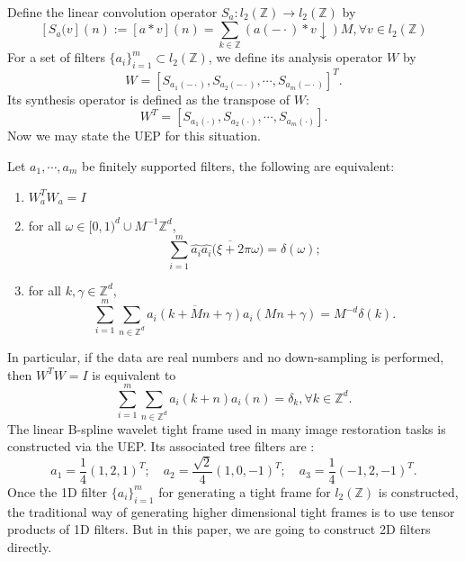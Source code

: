 \documentclass[a4paper]{article}
\begin{document}
Define the linear convolution operator $S_a: l_2(\mathbb{Z}) \rightarrow l_2(\mathbb{Z})$ by 
\[
[S_a(v](n):=[a*v](n)=\sum_{k\in\mathbb{Z}} (a(-\cdot)*v \downarrow)M, \forall v\in l_2(\mathbb{Z})
\]
For a set of filters $\{a_i\}_{i=1}^m\subset l_2(\mathbb{Z})$, we define its analysis operator $W$ by 
\[
	W=[S_{a_1(-\cdot)},S_{a_2(-\cdot)},\cdots,S_{a_m(-\cdot)}]^T.
\]
Its synthesis operator is defined as the transpose of $W$:
\[
	W^T=[S_{a_1(\cdot)},S_{a_2(\cdot)},\cdots, S_{a_m(\cdot )}].
\]
Now we may state the UEP for this situation.
\begin{prop}[cite]
Let $a_1,\cdots,a_m$ be finitely supported filters, the following are equivalent:
\begin{enumerate}
\item $W_a^T W_a = I$
\item for all $\omega \in [0,1)^d\cup M^{-1}\mathbb{Z}^d$,
	\[
		\sum_{i=1}^m \hat{a_i}\overline{\hat{a_i}(\xi + 2\pi\omega})=\delta(\omega);
	\]
\item for  all $k,\gamma \in \mathbb{Z}^d$,
	\[
		\sum_{i=1}^m \sum_{n\in\mathbb{Z}^d} \overline{a_i(k+Mn+\gamma)}a_i(Mn+\gamma)=M^{-d}\delta(k).
	\]
\end{enumerate}
\end{prop}
In particular, if the data are real numbers and no down-sampling is performed, then $W^TW=I$ is equivalent to 
\begin{equation}
\label{eq:uep}
	\sum_{i=1}^m \sum_{n\in \mathbb{Z}^d} a_i(k+n) a_i(n)=\delta_k, \forall k\in \mathbb{Z}^d.
\end{equation}
The linear B-spline wavelet tight frame used in many image restoration tasks is constructed via the UEP. Its associated tree filters are :
\[
	a_1=\frac{1}{4}(1,2,1)^T; \quad a_2=\frac{\sqrt{2}}{4}(1,0,-1)^T; \quad a_3=\frac{1}{4}(-1,2,-1)^T.
\]
Once the 1D filter $\{a_i\}_{i=1}^m$ for generating a tight frame for $l_2(\mathbb{Z})$ is constructed, the traditional way of generating higher dimensional tight frames is to use tensor products of 1D filters. But in this paper, we are going to construct 2D filters directly.
\end{document}
